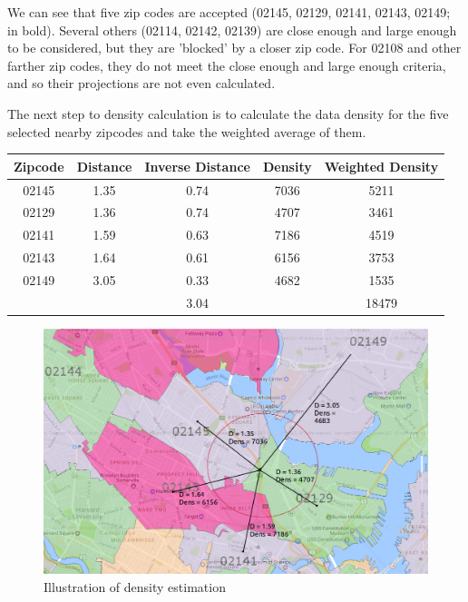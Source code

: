 \documentclass{article}
\begin{document}
We can see that five zip codes are accepted (02145, 02129, 02141, 02143, 02149; in bold). Several others (02114, 02142, 02139) are close enough and large enough to be considered, but they are 'blocked' by a closer zip code. For 02108 and other farther zip codes, they do not meet the close enough and large enough criteria, and so their projections are not even calculated. 

The next step to density calculation is to calculate the data density for the five selected nearby zipcodes and take the weighted average of them. 

\begin{center}
\begin{tabular}{ c c c c c }
\hline
Zipcode & Distance & Inverse Distance & Density & Weighted Density \\
\hline
02145 & 1.35 & 0.74 & 7036 & 5211 \\
02129 & 1.36 & 0.74 & 4707 & 3461 \\
02141 & 1.59 & 0.63 & 7186 & 4519 \\
02143 & 1.64 & 0.61 & 6156 & 3753 \\
02149 & 3.05 & 0.33 & 4682 & 1535 \\
\hline
&&3.04&&18479 \\

\end{tabular}
\end{center}

\begin{figure}[H]\label{fig:f2}
\begin{center}\includegraphics[scale=0.6]{Sullivan_for_density_with_markup}\end{center}
\caption{Illustration of density estimation}\end{figure}
\end{document}
